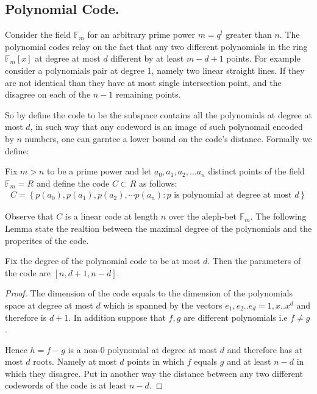 \subsection{Polynomial Code.} Consider the field $\mathbb{F}_{m}$ for an arbitrary prime power $m=q^{l}$ greater than $n$. The polynomial codes relay on the fact that any two different polynomials in the ring $\mathbb{F}_{m}\left[ x \right]$ at degree at most $d$ different by at least $m - d + 1$ points. For example consider a polynomials pair at degree 1, namely two linear straight lines. If they are not identical than they have at most single intersection point, and the disagree on each of the $n-1$ remaining points.  

So by define the code to be the subspace contains all the polynomials at degree at most $d$, in such way that any codeword is an image of such polynomail encoded by $n$ numbers, one can garntee a lower bound on the code's distance. Formally we define:     
\begin{definition}
  Fix $m > n $ to be a prime power and let $a_{0},a_{1},a_{2},\ldots a_{n}$ distinct points of the field $\mathbb{F}_{m} = R$  and define the code $C \subset R $ as follows:  
  \begin{equation*}
    \begin{split}
      C = \left\{p\left(a_{0}\right),p\left(a_{1}\right),p\left(a_{2}\right),\cdots p\left(a_{n}\right) : p \text{ is polynomial at degree at most } d \right\}
    \end{split}
  \end{equation*}
\end{definition}
Observe that $C$ is a linear code at length $n$ over the aleph-bet $\mathbb{F}_{m}$. The following Lemma state the realtion between the maximal degree of the polynomials and the properites of the code.   
\begin{lemma}
  Fix the degree of the polynomial code to be at most $d$. Then the parameters of the code are $[n,d + 1, n - d]$.  
  \label{polycode}
\end{lemma}
\begin{proof}
  The dimension of the code equals to the dimension of the polynomials space at degree at most $d$ which is spanned by the vectors $e_{1}, e_{2} .. e_{d} = 1, x .. x^{d}$ and therefore is $d+1$. In addition suppose that $f,g$ are different polynomials i.e $f\neq g$.

  Hence $h = f-g$ is a non-$0$ polynomial at degree at most $d$ and therefore has at most $d$ roots. Namely at most $d$ points in which $f$ equals $g$ and at least $n-d$ in which they disagree. Put in another way the distance between any two different codewords of the code is at least $n-d$.  
\end{proof}

